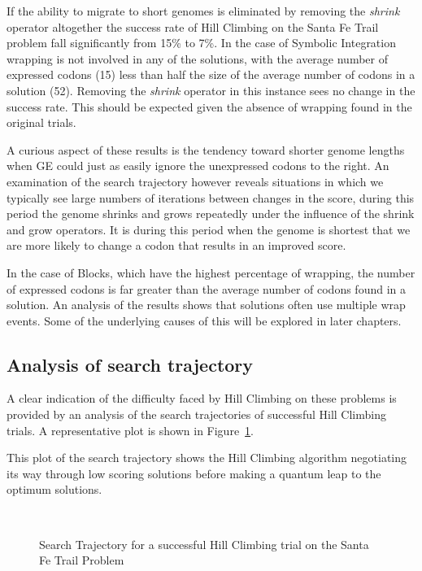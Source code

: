 If the ability to migrate to short genomes is eliminated by removing the \emph{shrink} operator altogether the success rate of Hill Climbing on the Santa Fe Trail problem fall significantly from 15\% to 7\%.   
In the case of Symbolic Integration wrapping is not involved in any of the solutions, with the average number of expressed codons (15) less than  half the size of the average number of codons in a solution (52).  Removing the \emph{shrink} operator in this instance sees no change in the success rate. This should be expected given the absence of wrapping found in the original trials.

A curious aspect of these results is the tendency toward shorter  genome lengths when GE could just as easily ignore the unexpressed codons to the right. An examination of the search trajectory however reveals situations in which  we typically see large numbers of iterations between changes in the score, during this period the genome shrinks and grows repeatedly under the influence of the shrink and grow operators. It is during this period when the genome is shortest that we are more likely to change a codon that results in an improved score.

In the case of Blocks, which have the highest percentage of wrapping, the number of expressed codons is far greater than the average number of codons found in a solution. An analysis of the results shows that solutions often use multiple wrap events. Some of the underlying causes of this will be explored in later chapters.

\subsection{Analysis of search trajectory}
A clear indication of the difficulty faced by Hill Climbing on these problems is provided by an analysis of the search trajectories of successful Hill Climbing trials. A representative plot is shown in Figure~\ref{hc_search1}.

This  plot of the search trajectory shows the Hill Climbing algorithm negotiating its way through low scoring solutions before making a quantum leap to the optimum solutions. 

\begin{figure}[]
\centerline{\hbox{
}}
\caption[Search Trajectory for a successful Hill Climbing trial]{Search Trajectory for a successful Hill Climbing trial on the Santa Fe Trail Problem}
\label{hc_search1}
\end{figure}



